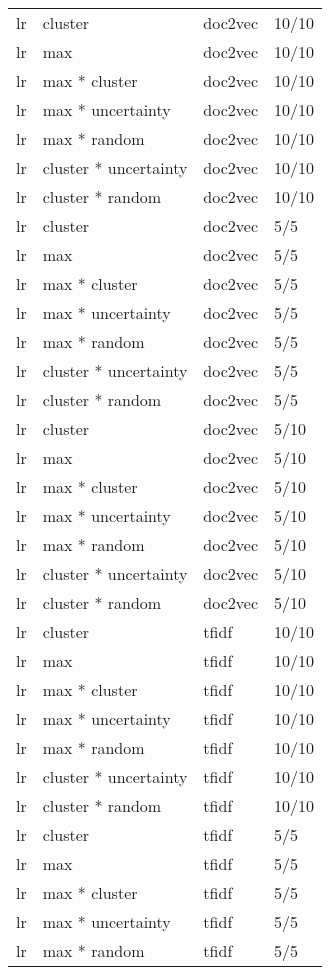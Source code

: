 \documentclass[12pt,twoside]{reedthesis}
\begin{document}
\begin{longtable}{llll}
lr & cluster & doc2vec & 10/10\\
\addlinespace
lr & max & doc2vec & 10/10\\
lr & max * cluster & doc2vec & 10/10\\
lr & max * uncertainty & doc2vec & 10/10\\
lr & max * random & doc2vec & 10/10\\
lr & cluster * uncertainty & doc2vec & 10/10\\
\addlinespace
lr & cluster * random & doc2vec & 10/10\\
lr & cluster & doc2vec & 5/5\\
lr & max & doc2vec & 5/5\\
lr & max * cluster & doc2vec & 5/5\\
lr & max * uncertainty & doc2vec & 5/5\\
\addlinespace
lr & max * random & doc2vec & 5/5\\
lr & cluster * uncertainty & doc2vec & 5/5\\
lr & cluster * random & doc2vec & 5/5\\
lr & cluster & doc2vec & 5/10\\
lr & max & doc2vec & 5/10\\
\addlinespace
lr & max * cluster & doc2vec & 5/10\\
lr & max * uncertainty & doc2vec & 5/10\\
lr & max * random & doc2vec & 5/10\\
lr & cluster * uncertainty & doc2vec & 5/10\\
lr & cluster * random & doc2vec & 5/10\\
\addlinespace
lr & cluster & tfidf & 10/10\\
lr & max & tfidf & 10/10\\
lr & max * cluster & tfidf & 10/10\\
lr & max * uncertainty & tfidf & 10/10\\
lr & max * random & tfidf & 10/10\\
\addlinespace
lr & cluster * uncertainty & tfidf & 10/10\\
lr & cluster * random & tfidf & 10/10\\
lr & cluster & tfidf & 5/5\\
lr & max & tfidf & 5/5\\
lr & max * cluster & tfidf & 5/5\\
\addlinespace
lr & max * uncertainty & tfidf & 5/5\\
lr & max * random & tfidf & 5/5\\

\end{longtable}
\end{document}
